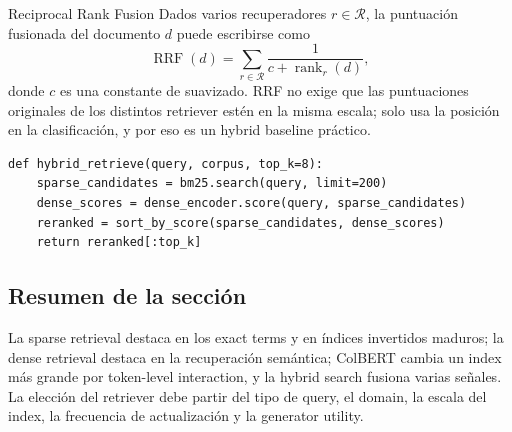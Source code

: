 \begin{importantbox}{Reciprocal Rank Fusion}
Dados varios recuperadores $r\in\mathcal{R}$, la puntuación fusionada del documento $d$ puede escribirse como
\[
\operatorname{RRF}(d)=\sum_{r\in\mathcal{R}}\frac{1}{c+\operatorname{rank}_r(d)},
\]
donde $c$ es una constante de suavizado. RRF no exige que las puntuaciones originales de los distintos retriever estén en la misma escala; solo usa la posición en la clasificación, y por eso es un hybrid baseline práctico.
\end{importantbox}

\begin{lstlisting}[caption={Recuperación en dos etapas: sparse recall + dense rerank}]
def hybrid_retrieve(query, corpus, top_k=8):
    sparse_candidates = bm25.search(query, limit=200)
    dense_scores = dense_encoder.score(query, sparse_candidates)
    reranked = sort_by_score(sparse_candidates, dense_scores)
    return reranked[:top_k]
\end{lstlisting}


\subsection{Resumen de la sección}

La sparse retrieval destaca en los exact terms y en índices invertidos maduros; la dense retrieval destaca en la recuperación semántica; ColBERT cambia un index más grande por token-level interaction, y la hybrid search fusiona varias señales. La elección del retriever debe partir del tipo de query, el domain, la escala del index, la frecuencia de actualización y la generator utility.
